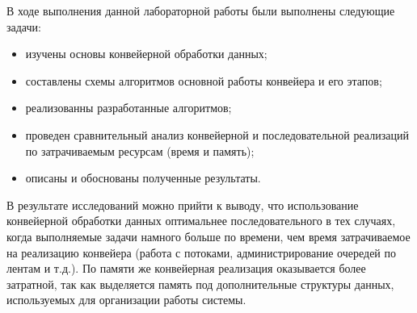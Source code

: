 
В ходе выполнения данной лабораторной работы были выполнены следующие задачи:
\begin{itemize}
	\item изучены основы конвейерной обработки данных;
	\item составлены схемы алгоритмов основной работы конвейера и его этапов;
	\item реализованны разработанные алгоритмов;
	\item проведен сравнительный анализ конвейерной и последовательной реализаций по затрачиваемым ресурсам (время и память);
	\item описаны и обоснованы полученные результаты.
\end{itemize}

В результате исследований можно прийти к выводу, что использование конвейерной обработки данных оптимальнее последовательного в тех случаях, когда выполняемые задачи намного больше по времени, чем время затрачиваемое на реализацию конвейера (работа с потоками, администрирование очередей по лентам и т.д.). По памяти же конвейерная реализация оказывается более затратной, так как выделяется память под дополнительные структуры данных, используемых для организации работы системы.